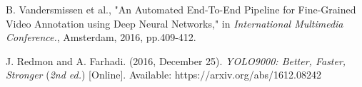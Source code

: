 \documentclass[conference]{IEEEtran}
\begin{document}
%
%

%
%

\begin{thebibliography}{9}

B. Vandersmissen et al., "An Automated End-To-End Pipeline for Fine-Grained Video Annotation using Deep Neural Networks," in 
\textit{International Multimedia Conference.}, Amsterdam, 2016, pp.409-412.
 
J. Redmon and A. Farhadi. (2016, December 25). 
\textit{YOLO9000: Better, Faster, Stronger} (\textit{2nd ed.}) [Online]. Available: https://arxiv.org/abs/1612.08242

\end{thebibliography}



\end{document}
